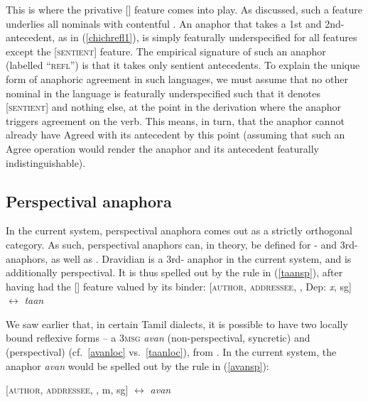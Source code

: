 \documentclass[output=paper, modfonts, nonflat]{langsci/langscibook}
\begin{document}
This is where the privative [\sentience] feature comes into play. As
discussed, such a feature underlies all nominals with contentful
\person. An anaphor that takes a 1st and 2nd-\person{} antecedent, as
in (\ref{chichrefl1}), is simply featurally underspecified for all
features except the [\textsc{sentient}] feature. The empirical signature of
such an anaphor (labelled ``\textsc{refl}'') is that it takes only
sentient antecedents. To explain the unique form of anaphoric
agreement in such languages, we must assume that no other nominal in
the language is featurally underspecified such that it denotes
[\textsc{sentient}] and nothing else, at the point in the derivation where the
anaphor triggers agreement on the verb. This means, in turn, that the
anaphor cannot already have Agreed with its antecedent by this point
(assuming that such an Agree operation would render the anaphor and
its antecedent featurally indistinguishable).



        \subsection{Perspectival anaphora}

        
        In the current system, perspectival anaphora comes out as a
        strictly orthogonal category. As such, perspectival anaphors
        can, in theory, be defined for \nul-\person{} and
        3rd-\person{} anaphors, as well as . Dravidian \taan{} is
        a 3rd-\person{} anaphor in the current system, and is
        additionally perspectival. It is thus spelled out by the rule
        in (\ref{taansp}), after having had the [\dep] feature valued
        by its binder: \ea\label{taansp} {[}\textminus \textsc{author}, \textminus \textsc{addressee}, \sentience,
        Dep: \textit{x}, sg] $\leftrightarrow$ \textit{taan} \z

        \noindent We saw earlier that, in certain Tamil dialects, it is possible
        to have two locally bound reflexive forms -- a \textsc{3msg}
        \textit{avan} (non-perspectival, syncretic) and \taan{}
        (perspectival) (cf.\ \ref{avanloc} vs.\ \ref{taanloc}),
        from \citet{sundaresan:2012}. In the current system, the
        anaphor \textit{avan} would be spelled out by the rule in
        (\ref{avansp}):

        \ea\label{avansp} {[}\textminus \textsc{author}, \textminus \textsc{addressee}, \sentience, m, sg]
        $\leftrightarrow$ \textit{avan} \z
\end{document}
